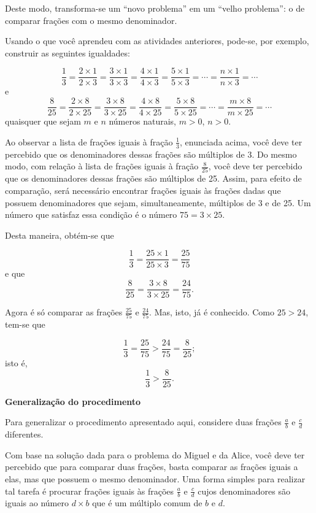 Deste modo, transforma-se um ``novo problema'' em um ``velho problema'': o de comparar frações com o mesmo denominador.

Usando o que você aprendeu com as atividades anteriores, pode-se, por exemplo, construir as seguintes igualdades:

$$\dfrac{1}{3} = \dfrac{2 \times 1}{2 \times 3} = \dfrac{3 \times 1}{3 \times 3} = \dfrac{4 \times 1}{4 \times 3} = \dfrac{5 \times 1}{5 \times 3} = \cdots = \dfrac{n \times 1}{n\times 3} = \cdots$$
e
$$\dfrac{8}{25} = \dfrac{2 \times 8}{2 \times 25} = \dfrac{3 \times 8}{3 \times 25} = \dfrac{4 \times 8}{4 \times 25} = \dfrac{5 \times 8}{5 \times 25} = \cdots = \dfrac{m \times 8}{m\times 25} = \cdots$$
quaisquer que sejam $m$ e $n$ números naturais, $m > 0$, $n > 0$.

Ao observar a lista de frações iguais à fração $\frac{1}{3}$, enunciada acima, você deve ter percebido que os denominadores dessas frações são múltiplos de 3.  Do mesmo modo, com relação à lista de frações iguais à fração $\frac{8}{25}$, você deve ter percebido que os denominadores dessas frações são múltiplos de 25. Assim, para efeito de comparação, será necessário encontrar frações iguais às frações dadas que possuem denominadores que sejam, simultaneamente, múltiplos de 3 e de 25. Um número que satisfaz essa condição é o número $75 = 3 \times 25$.

Desta maneira, obtém-se que

$$\dfrac{1}{3} = \dfrac{25 \times 1}{25 \times 3} = \dfrac{25}{75}$$
e que
$$\dfrac{8}{25} = \dfrac{3 \times 8}{3 \times 25} = \dfrac{24}{75}.$$

Agora é só comparar as frações $\frac{25}{75}$ e $\frac{24}{75}$. Mas, isto, já é conhecido.
Como $25 > 24$, tem-se que

$$\dfrac{1}{3} = \dfrac{25}{75} > \dfrac{24}{75} =  \dfrac{8}{25};$$
isto é,
$$\dfrac{1}{3} > \dfrac{8}{25}.$$

{\bf Generalização do procedimento}

Para generalizar o procedimento apresentado aqui, considere duas frações $\frac{a}{b}$ e $\frac{c}{d}$ diferentes.

Com base na solução dada para o problema do Miguel e da Alice, você deve ter percebido que para comparar duas frações, basta comparar as frações iguais a elas, mas que possuem o mesmo denominador. Uma forma simples para realizar tal tarefa é procurar frações iguais às frações  $\frac{a}{b}$ e $\frac{c}{d}$ cujos denominadores são iguais ao número $d\times b$ que é um múltiplo comum de $b$ e $d$.

